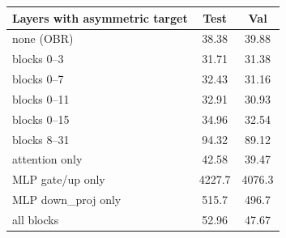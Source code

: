 \begin{tabular}{lcc}
\toprule
Layers with asymmetric target & Test & Val \\
\midrule
none (OBR) & 38.38 & 39.88 \\
blocks 0--3 & 31.71 & 31.38 \\
blocks 0--7 & 32.43 & 31.16 \\
blocks 0--11 & 32.91 & 30.93 \\
blocks 0--15 & 34.96 & 32.54 \\
blocks 8--31 & 94.32 & 89.12 \\
attention only & 42.58 & 39.47 \\
MLP gate/up only & 4227.7 & 4076.3 \\
MLP down\_proj only & 515.7 & 496.7 \\
all blocks & 52.96 & 47.67 \\
\bottomrule
\end{tabular}
